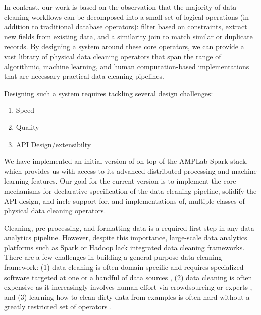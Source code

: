 


In contrast, our work is based on the observation that the majority of data cleaning workflows
can be decomposed into a small set of logical operations (in addition to traditional database operators):
filter based on constraints, extract new fields from existing data, and a similarity join to match
similar or duplicate records.    
By designing a system around these core operators, we can provide a vast library of physical  
data cleaning operators that span the range of algorithmic, machine learning, and human computation-based
implementations that are necessary practical data cleaning pipelines.   

Designing such a system requires tackling several design challenges:

\begin{enumerate}
\item Speed
\item Quality
\item API Design/extensibilty
\end{enumerate}



We have implemented an initial version of \sys on top of the AMPLab Spark stack, which provides us 
with access to its advanced distributed processing and machine learning features.  Our goal for the current
version is to implement the core mechanisms for declarative specification of the
data cleaning pipeline, solidify the API design, and incle support for, and implementations of,
multiple classes of physical data cleaning operators.


\fi




Cleaning, pre-processing, and formatting data is a required first step in any data analytics pipeline.
However, despite this importance, large-scale data analytics platforms such as Spark or Hadoop lack integrated data cleaning frameworks.
There are a few challenges in building a general purpose data cleaning framework: (1) data cleaning is often
domain specific and requires specialized software targeted at one or a handful of data sources \cite{wang1999sample}, (2) data cleaning is often 
expensive as it increasingly involves human effort via crowdsourcing or experts \cite{DBLP:conf/sigmod/GokhaleDDNRSZ14}, and (3) learning how to clean dirty data from examples
is often hard without a greatly restricted set of operators \cite{DBLP:conf/uist/GuoKHH11}.

